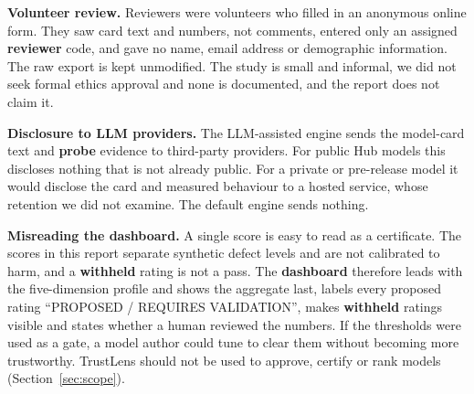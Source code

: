 \textbf{Volunteer review.} Reviewers were volunteers who filled in an anonymous online form. They saw card text and numbers, not comments, entered only an assigned \textbf{reviewer} code, and gave no name, email address or demographic information. The raw export is kept unmodified. The study is small and informal, we did not seek formal ethics approval and none is documented, and the report does not claim it.

\textbf{Disclosure to LLM providers.} The LLM-assisted engine sends the model-card text and \textbf{probe} evidence to third-party providers. For public Hub models this discloses nothing that is not already public. For a private or pre-release model it would disclose the card and measured behaviour to a hosted service, whose retention we did not examine. The default engine sends nothing.

\textbf{Misreading the dashboard.} A single score is easy to read as a certificate. The scores in this report separate synthetic defect levels and are not calibrated to harm, and a \textbf{withheld} rating is not a pass. The \textbf{dashboard} therefore leads with the five-dimension profile and shows the aggregate last, labels every proposed rating ``PROPOSED / REQUIRES VALIDATION'', makes \textbf{withheld} ratings visible and states whether a human reviewed the numbers. If the thresholds were used as a gate, a model author could tune to clear them without becoming more trustworthy. TrustLens should not be used to approve, certify or rank models (Section~\ref{sec:scope}).
